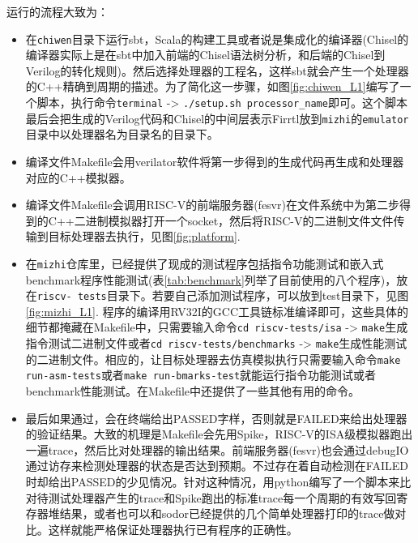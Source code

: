 	运行的流程大致为：
	\begin{itemize}
		\item 在\texttt{chiwen}目录下运行sbt，Scala的构建工具或者说是集成化的编译器(Chisel的编译器实际上是在sbt中加入前端的Chisel语法树分析，和后端的Chisel到Verilog的转化规则)。然后选择处理器的工程名，这样sbt就会产生一个处理器的C++精确到周期的描述。为了简化这一步骤，如图\ref{fig:chiwen_L1}编写了一个脚本，执行命令{\footnotesize \verb|terminal| -> \verb|./setup.sh processor_name|}即可。这个脚本最后会把生成的Verilog代码和Chisel的中间层表示Firrtl放到\texttt{mizhi}的\texttt{emulator}目录中以处理器名为目录名的目录下。
		\item 编译文件Makefile会用verilator软件将第一步得到的生成代码再生成和处理器对应的C++模拟器。
		\item 编译文件Makefile会调用RISC-V的前端服务器(fesvr)在文件系统中为第二步得到的C++二进制模拟器打开一个socket，然后将RISC-V的二进制文件文件传输到目标处理器去执行，见图\ref{fig:platform}.
		\item 在\texttt{mizhi}仓库里，已经提供了现成的测试程序包括指令功能测试和嵌入式benchmark程序性能测试(表\ref{tab:benchmark}列举了目前使用的八个程序)，放在\texttt{riscv- tests}目录下。若要自己添加测试程序，可以放到test目录下，见图\ref{fig:mizhi_L1}. 程序的编译用RV32I的GCC工具链标准编译即可，这些具体的细节都掩藏在Makefile中，只需要输入命令{\footnotesize \verb|cd riscv-tests/isa| -> \verb|make|}生成指令测试二进制文件或者{\footnotesize \verb|cd riscv-tests/benchmarks| -> \verb|make|}生成性能测试的二进制文件。相应的，让目标处理器去仿真模拟执行只需要输入命令{\footnotesize \verb|make run-asm-tests|}或者{\footnotesize \verb|make run-bmarks-test|}就能运行指令功能测试或者benchmark性能测试。在Makefile中还提供了一些其他有用的命令。
		\item 最后如果通过，会在终端给出PASSED字样，否则就是FAILED来给出处理器的验证结果。大致的机理是Makefile会先用Spike，RISC-V的ISA级模拟器跑出一遍trace，然后比对处理器的输出结果。前端服务器(fesvr)也会通过debugIO通过访存来检测处理器的状态是否达到预期。不过存在着自动检测在FAILED时却给出PASSED的少见情况。针对这种情况，用python编写了一个脚本来比对待测试处理器产生的trace和Spike跑出的标准trace每一个周期的有效写回寄存器堆结果，或者也可以和sodor已经提供的几个简单处理器打印的trace做对比。这样就能严格保证处理器执行已有程序的正确性。
	\end{itemize}
	
